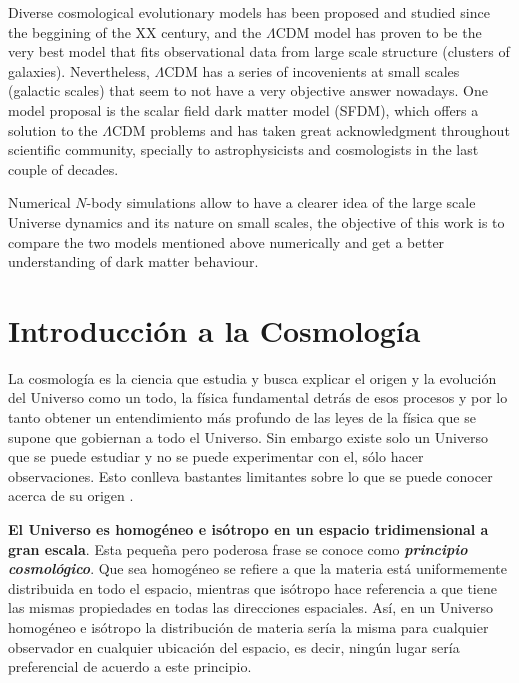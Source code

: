 \documentclass[a4paper,openright,12pt]{book}
\begin{document}
Diverse cosmological evolutionary models has been proposed and studied since the beggining of the XX century, and the $\Lambda$CDM model has proven to be the very best model that fits observational data from large scale structure (clusters of galaxies). Nevertheless, $\Lambda$CDM has a series of incovenients at small scales (galactic scales) that seem to not have a very objective answer nowadays. One model proposal is the scalar field dark matter model (SFDM), which offers a solution to the $\Lambda$CDM problems and has taken great acknowledgment throughout scientific community, specially to astrophysicists and cosmologists in the last couple of decades.

Numerical $N$-body simulations allow to have a clearer idea of the large scale Universe dynamics and its nature on small scales, the objective of this work is to compare the two models mentioned above numerically and get a better understanding of dark matter behaviour.
\thispagestyle{empty}

\tableofcontents %
\thispagestyle{empty}

\cleardoublepage
\thispagestyle{empty}
\listoffigures %
\thispagestyle{empty}





\chapter{Introducción a la Cosmología}
La cosmología es la ciencia que estudia y busca explicar el origen y la evolución del Universo como un todo, la física fundamental detrás de esos procesos y por lo tanto obtener un entendimiento más profundo de las leyes de la física que se supone que gobiernan a todo el Universo. Sin embargo existe solo un Universo que se puede estudiar y no se puede  experimentar con el, sólo hacer observaciones. Esto conlleva bastantes limitantes sobre lo que se puede conocer acerca de su origen \cite{1.01}. 

\textbf{El Universo es homogéneo e isótropo en un espacio tridimensional a gran escala}. Esta pequeña pero poderosa frase se conoce como \textbf{\textit{principio cosmológico}}. Que sea homogéneo se refiere a que la materia está uniformemente distribuida en todo el espacio, mientras que isótropo hace referencia a que tiene las mismas propiedades en todas las direcciones espaciales. Así, en un Universo homogéneo e isótropo la distribución de materia sería la misma para cualquier observador en cualquier ubicación del espacio, es decir, ningún lugar sería preferencial de acuerdo a este principio.
\end{document}
